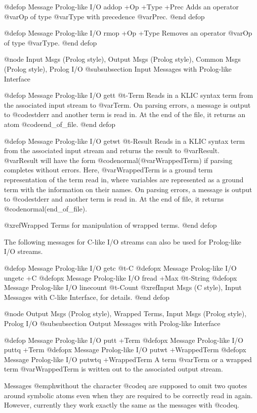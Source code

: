 {{{{@defop {Message} {Prolog-like I/O} addop +Op +Type +Prec
Adds an operator @var{Op} of type @var{Type} with precedence
@var{Prec}.
@end defop

@defop {Message} {Prolog-like I/O} rmop +Op +Type
Removes an operator @var{Op} of type @var{Type}.
@end defop

@node Input Msgs (Prolog style), Output Msgs (Prolog style), Common Msgs (Prolog style), Prolog I/O
@subsubsection Input Messages with Prolog-like Interface

@defop {Message} {Prolog-like I/O} gett @t{-}Term
Reads in a KLIC syntax term from the associated input stream to
@var{Term}.  On parsing errors, a message is output to @code{stderr} and
another term is read in.  At the end of the file, it returns an atom
@code{end_of_file}.
@end defop

@defop {Message} {Prolog-like I/O} getwt @t{-}Result
Reads in a KLIC syntax term from the associated input stream and
returns the result to @var{Result}.  @var{Result} will have the form
@code{normal(@var{WrappedTerm})} if parsing completes without errors.
Here, @var{WrappedTerm} is a ground term representation of the term read
in, where variables are represented as a ground term with the
information on their names.  On parsing errors, a message is output to
@code{stderr} and another term is read in.  At the end of file, it
returns @code{normal(end_of_file)}.

@xref{Wrapped Terms} for manipulation of wrapped terms.
@end defop

The following messages for C-like I/O streams can also be used for
Prolog-like I/O streams.

@defop {Message} {Prolog-like I/O} getc @t{-}C
@defopx {Message} {Prolog-like I/O} ungetc +C
@defopx {Message} {Prolog-like I/O} fread +Max @t{-}String
@defopx {Message} {Prolog-like I/O} linecount @t{-}Count
@xref{Input Msgs (C style), Input Messages with C-like Interface}, for
details.
@end defop

@node Output Msgs (Prolog style), Wrapped Terms, Input Msgs (Prolog style), Prolog I/O
@subsubsection Output Messages with Prolog-like Interface

@defop {Message} {Prolog-like I/O} putt +Term
@defopx {Message} {Prolog-like I/O} puttq +Term
@defopx {Message} {Prolog-like I/O} putwt +WrappedTerm
@defopx {Message} {Prolog-like I/O} putwtq +WrappedTerm
A term @var{Term} or a wrapped term @var{WrappedTerm} is written out to
the associated output stream.

Messages @emph{without} the character @code{q} are supposed to omit two
quotes around symbolic atoms even when they are required to be correctly
read in again.  However, currently they work exactly the same as the
messages with @code{q}.

}}}}
